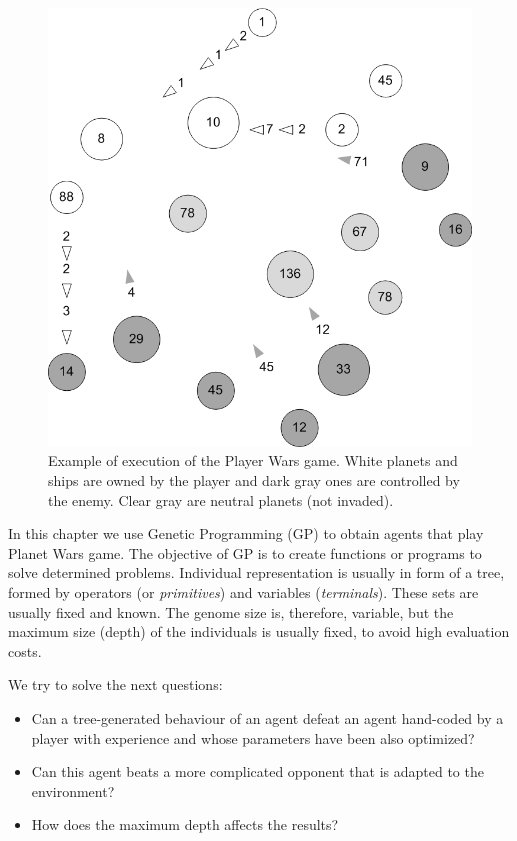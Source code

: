 \begin{figure}
\includegraphics[scale =0.7] {gfx/rts/naves.png}

\caption{Example of execution of the Player Wars game. White planets and ships are owned by the player and dark gray ones are controlled by the enemy. Clear gray are neutral planets (not invaded).}
\label{fig:naves}
\end{figure}


In this chapter we use Genetic Programming (GP) to obtain agents that play
Planet Wars game. %
The objective of GP is to create functions or programs to solve determined problems. Individual representation is usually in form of a tree, formed by operators (or {\em primitives}) and variables ({\em terminals}). These sets are usually fixed and known. The genome size is, therefore, variable, but the maximum size (depth) of the individuals is usually fixed, to avoid high evaluation costs. %


We try to solve the next questions: 
\begin{itemize}
\item Can a tree-generated behaviour of an agent defeat an agent hand-coded by a player with experience and whose parameters have been also optimized?
\item Can this agent beats a more complicated opponent that is adapted to the environment?
\item How does the maximum depth affects the results?
\end{itemize}

